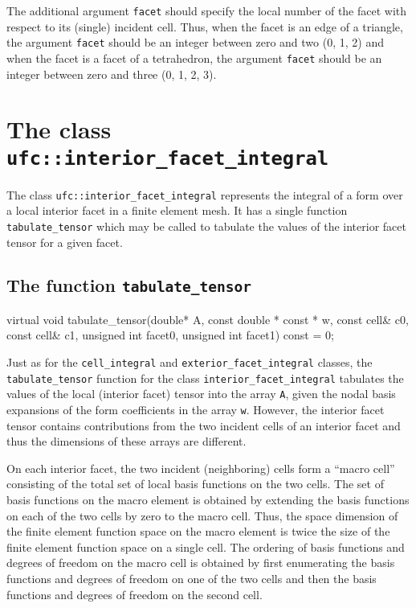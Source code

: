 The additional argument \texttt{facet} should specify the local number
of the facet with respect to its (single) incident cell. Thus, when
the facet is an edge of a triangle, the argument \texttt{facet} should
be an integer between zero and two (0, 1, 2) and when the facet is a
facet of a tetrahedron, the argument \texttt{facet} should be an
integer between zero and three (0, 1, 2, 3).

\section{The class \texttt{ufc::interior\_facet\_integral}}

The class \texttt{ufc::interior\_facet\_integral} represents the
integral of a form over a local interior facet in a finite element
mesh. It has a single function \texttt{tabulate\_tensor} which may be
called to tabulate the values of the interior facet tensor for a given
facet.

\subsection{The function \texttt{tabulate\_tensor}}

\begin{code}
virtual void tabulate_tensor(double* A,
                             const double * const * w,
                             const cell& c0,
                             const cell& c1,
                             unsigned int facet0,
                             unsigned int facet1) const = 0;
\end{code}

Just as for the \texttt{cell\_integral} and
\texttt{exterior\_facet\_integral} classes, the
\texttt{tabulate\_tensor} function for the class
\texttt{interior\_facet\_integral} tabulates the values of the local
(interior facet) tensor into the array \texttt{A}, given the nodal
basis expansions of the form coefficients in the array \texttt{w}.
However, the interior facet tensor contains contributions from the two
incident cells of an interior facet and thus the dimensions of these
arrays are different.

On each interior facet, the two incident (neighboring) cells form a
``macro cell'' consisting of the total set of local basis functions on
the two cells. The set of basis functions on the macro element is
obtained by extending the basis functions on each of the two cells by
zero to the macro cell. Thus, the space dimension of the finite
element function space on the macro element is twice the size of the
finite element function space on a single cell. The ordering of basis
functions and degrees of freedom on the macro cell is obtained by
first enumerating the basis functions and degrees of freedom on one of
the two cells and then the basis functions and degrees of freedom on
the second cell.

